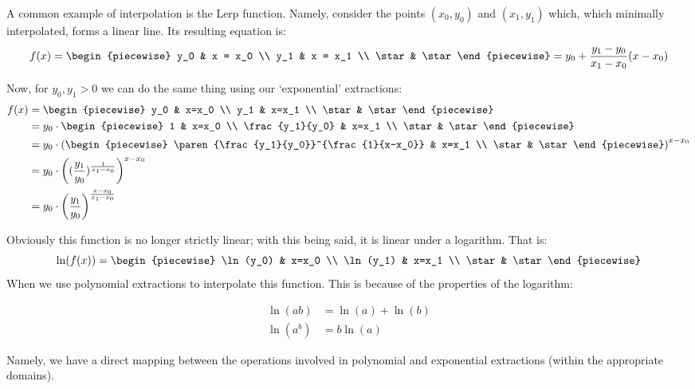 \begin{example}
    A common example of interpolation is the Lerp function. Namely, consider the points $(x_0,y_0)$ and $(x_1,y_1)$ which, which minimally interpolated, forms a linear line. Its resulting equation is:
    $$
        f(x) = \begin{piecewise}
            y_0 & x = x_0 \\
            y_1 & x = x_1 \\
            \star & \star
        \end{piecewise} = y_0 + \frac{y_1-y_0}{x_1-x_0}\paren{x-x_0}
    $$

    Now, for $y_0,y_1>0$ we can do the same thing using our `exponential' extractions:
    \begin{align*}
        f(x) &= \begin{piecewise}
            y_0 & x=x_0 \\
            y_1 & x=x_1 \\
            \star & \star
        \end{piecewise} \\
        & = y_0\cdot\begin{piecewise}
            1 & x=x_0 \\
            \frac{y_1}{y_0} & x=x_1 \\
            \star & \star
        \end{piecewise} \\
        &= y_0\cdot\paren*{\begin{piecewise}
            \paren{\frac{y_1}{y_0}}^{\frac{1}{x-x_0}} & x=x_1 \\
            \star & \star
        \end{piecewise}}^{x-x_0} \\
        &= y_0\cdot\paren*{\paren{\frac{y_1}{y_0}}^{\frac{1}{x_1-x_0}}}^{x-x_0} \\
        &= y_0\cdot\paren*{\frac{y_1}{y_0}}^{\frac{x-x_0}{x_1-x_0}}
    \end{align*}

    Obviously this function is no longer strictly linear; with this being said, it is linear under a logarithm. That is:
    $$
        \ln(f(x)) = \begin{piecewise}
            \ln(y_0) & x=x_0 \\
            \ln(y_1) & x=x_1 \\
            \star & \star
        \end{piecewise}
    $$
    When we use polynomial extractions to interpolate this function. This is because of the properties of the logarithm:

    \begin{align*}
        \ln(ab) &=\ln(a)+\ln(b) \\
        \ln(a^b) &= b\ln(a)
    \end{align*}

    Namely, we have a direct mapping between the operations involved in polynomial and exponential extractions (within the appropriate domains).
\end{example}


